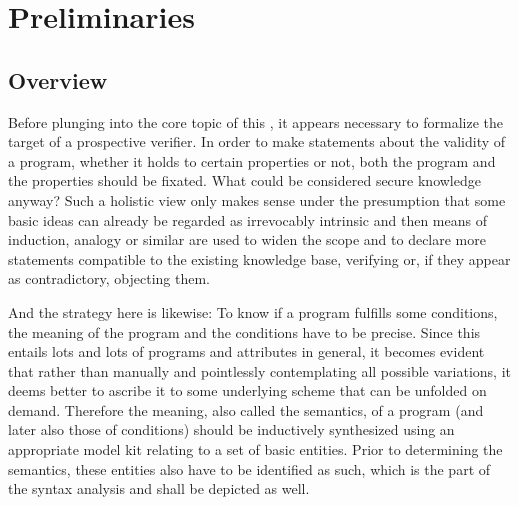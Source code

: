\chapter{Preliminaries}

\section{Overview}

Before plunging into the core topic of this \paper{}, it appears necessary to formalize the target of a prospective verifier. In order to make statements about the validity of a program, whether it holds to certain properties or not, both the program and the properties should be fixated. What could be considered secure knowledge anyway? Such a holistic view only makes sense under the presumption that some basic ideas can already be regarded as irrevocably intrinsic and then means of induction, analogy or similar are used to widen the scope and to declare more statements compatible to the existing knowledge base, verifying or, if they appear as contradictory, objecting them.

And the strategy here is likewise: To know if a program fulfills some conditions, the meaning of the program and the conditions have to be precise. Since this entails lots and lots of programs and attributes in general, it becomes evident that rather than manually and pointlessly contemplating all possible variations, it deems better to ascribe it to some underlying scheme that can be unfolded on demand. Therefore the meaning, also called the semantics, of a program (and later also those of conditions) should be inductively synthesized using an appropriate model kit relating to a set of basic entities. Prior to determining the semantics, these entities also have to be identified as such, which is the part of the syntax analysis and shall be depicted as well.

